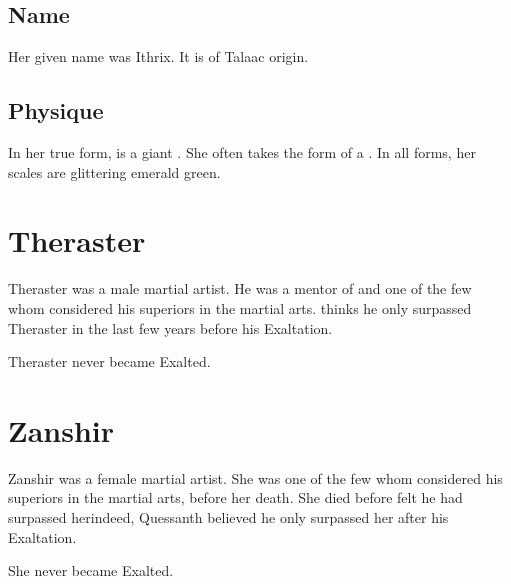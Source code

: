 \subsection{Name}
Her given name was Ithrix.
It is of Talaac origin.









\subsection{Physique}
In her true form, \Sarokash is a giant \nagalord. 
She often takes the form of a \scatha. 
In all forms, her scales are glittering emerald green. 















\section{Theraster}
Theraster was a male \caisith martial artist. 
He was a mentor of \Quessanth and one of the few whom \Quessanth considered his superiors in the martial arts. 
\Quessanth thinks he only surpassed Theraster in the last few years before his Exaltation.

Theraster never became Exalted.















\section{Zanshir}
Zanshir was a female \caisith martial artist. 
She was one of the few whom \Quessanth considered his superiors in the martial arts, before her death. 
She died before \Quessanth felt he had surpassed her\dash indeed, Quessanth believed he only surpassed her after his Exaltation.

She never became Exalted.
















